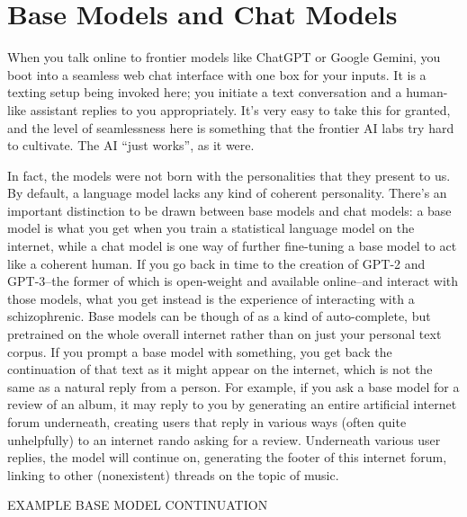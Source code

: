 \section{Base Models and Chat Models}
When you talk online to frontier models like ChatGPT or Google Gemini, you boot
into a seamless web chat interface with one box for your inputs. It is a
texting setup being invoked here; you initiate a text conversation and a
human-like assistant replies to you appropriately. It's very easy to take this
for granted, and the level of seamlessness here is something that the frontier
AI labs try hard to cultivate. The AI ``just works'', as it were.

In fact, the models were not born with the personalities that they present to
us. By default, a language model lacks any kind of coherent personality.
There's an important distinction to be drawn between base models and chat
models: a base model is what you get when you train a statistical language
model on the internet, while a chat model is one way of further fine-tuning a
base model to act like a coherent human. If you go back in time to the creation
of GPT-2 and GPT-3--the former of which is open-weight and available
online--and interact with those models, what you get instead is the experience
of interacting with a schizophrenic. Base models can be though of as a kind of
auto-complete, but pretrained on the whole overall internet rather than on just
your personal text corpus. If you prompt a base model with something, you get
back the continuation of that text as it might appear on the internet, which is
not the same as a natural reply from a person. For example, if you ask a base
model for a review of an album, it may reply to you by generating an entire
artificial internet forum underneath, creating users that reply in various ways
(often quite unhelpfully) to an internet rando asking for a review. Underneath
various user replies, the model will continue on, generating the footer of this
internet forum, linking to other (nonexistent) threads on the topic of music.

EXAMPLE BASE MODEL CONTINUATION

